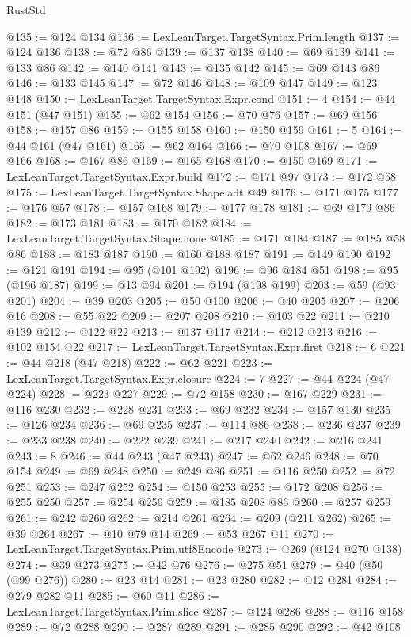 \begin{lexlean}{RustStd}
\begin{coremodule}
@135 := @124 @134
@136 := LexLeanTarget.TargetSyntax.Prim.length
@137 := @124 @136
@138 := @72 @86
@139 := @137 @138
@140 := @69 @139
@141 := @133 @86
@142 := @140 @141
@143 := @135 @142
@145 := @69 @143 @86
@146 := @133 @145
@147 := @72 @146
@148 := @109 @147
@149 := @123 @148
@150 := LexLeanTarget.TargetSyntax.Expr.cond
@151 := 4
@154 := @44 @151 (@47 @151)
@155 := @62 @154
@156 := @70 @76
@157 := @69 @156
@158 := @157 @86
@159 := @155 @158
@160 := @150 @159
@161 := 5
@164 := @44 @161 (@47 @161)
@165 := @62 @164
@166 := @70 @108
@167 := @69 @166
@168 := @167 @86
@169 := @165 @168
@170 := @150 @169
@171 := LexLeanTarget.TargetSyntax.Expr.build
@172 := @171 @97
@173 := @172 @58
@175 := LexLeanTarget.TargetSyntax.Shape.adt @49
@176 := @171 @175
@177 := @176 @57
@178 := @157 @168
@179 := @177 @178
@181 := @69 @179 @86
@182 := @173 @181
@183 := @170 @182
@184 := LexLeanTarget.TargetSyntax.Shape.none
@185 := @171 @184
@187 := @185 @58 @86
@188 := @183 @187
@190 := @160 @188 @187
@191 := @149 @190
@192 := @121 @191
@194 := @95 (@101 @192)
@196 := @96 @184 @51
@198 := @95 (@196 @187)
@199 := @13 @94
@201 := @194 (@198 @199)
@203 := @59 (@93 @201)
@204 := @39 @203
@205 := @50 @100
@206 := @40 @205
@207 := @206 @16
@208 := @55 @22
@209 := @207 @208
@210 := @103 @22
@211 := @210 @139
@212 := @122 @22
@213 := @137 @117
@214 := @212 @213
@216 := @102 @154 @22
@217 := LexLeanTarget.TargetSyntax.Expr.first
@218 := 6
@221 := @44 @218 (@47 @218)
@222 := @62 @221
@223 := LexLeanTarget.TargetSyntax.Expr.closure
@224 := 7
@227 := @44 @224 (@47 @224)
@228 := @223 @227
@229 := @72 @158
@230 := @167 @229
@231 := @116 @230
@232 := @228 @231
@233 := @69 @232
@234 := @157 @130
@235 := @126 @234
@236 := @69 @235
@237 := @114 @86
@238 := @236 @237
@239 := @233 @238
@240 := @222 @239
@241 := @217 @240
@242 := @216 @241
@243 := 8
@246 := @44 @243 (@47 @243)
@247 := @62 @246
@248 := @70 @154
@249 := @69 @248
@250 := @249 @86
@251 := @116 @250
@252 := @72 @251
@253 := @247 @252
@254 := @150 @253
@255 := @172 @208
@256 := @255 @250
@257 := @254 @256
@259 := @185 @208 @86
@260 := @257 @259
@261 := @242 @260
@262 := @214 @261
@264 := @209 (@211 @262)
@265 := @39 @264
@267 := @10 @79 @14
@269 := @53 @267 @11
@270 := LexLeanTarget.TargetSyntax.Prim.utf8Encode
@273 := @269 (@124 @270 @138)
@274 := @39 @273
@275 := @42 @76
@276 := @275 @51
@279 := @40 (@50 (@99 @276))
@280 := @23 @14
@281 := @23 @280
@282 := @12 @281
@284 := @279 @282 @11
@285 := @60 @11
@286 := LexLeanTarget.TargetSyntax.Prim.slice
@287 := @124 @286
@288 := @116 @158
@289 := @72 @288
@290 := @287 @289
@291 := @285 @290
@292 := @42 @108

\end{coremodule}
\end{lexlean}
